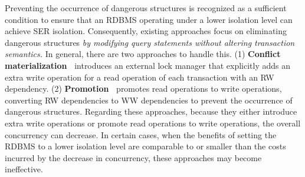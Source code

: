 
Preventing the occurrence of dangerous structures is recognized as a sufficient condition to ensure that an RDBMS operating under a lower isolation level can achieve SER isolation. Consequently, existing approaches focus on eliminating dangerous structures {\it by modifying query statements without altering transaction semantics.}
In general, there are two approaches to handle this.
(1) {\bf Conflict materialization~\cite{DBLP:conf/aiccsa/AlomariF15}} introduces an external lock manager that explicitly adds an extra write operation for a read operation of each transaction with an RW dependency.
(2) {\bf Promotion~\cite{DBLP:conf/icde/AlomariCFR08}} promotes read operations to write operations, converting RW dependencies to WW dependencies to prevent the occurrence of dangerous structures.
Regarding these approaches, because they either introduce extra write operations or promote read operations to write operations, the overall concurrency can decrease. In certain cases, when the benefits of setting the RDBMS to a lower isolation level are comparable to or smaller than the costs incurred by the decrease in concurrency, these approaches may become ineffective.


